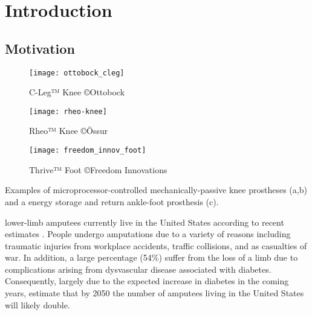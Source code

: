 \chapter{Introduction}\label{sec:intro}

\section{Motivation}\label{sec:intro_motivation}
\begin{marginfigure}[1in]
    \centering
	\begin{subfigure}[b]{\textwidth}
    	\centering
        \texttt{[image: ottobock\_cleg]}
        \caption{C-Leg™ Knee ©Ottobock}
        \label{fig:ottobock_cleg}
        \vspace{0.25in}
	\end{subfigure}
	\begin{subfigure}[b]{\textwidth}
    	\centering
        \texttt{[image: rheo-knee]}
        \caption{Rheo™  Knee ©Össur}
        \label{fig:ossur_rheo}
        \vspace{0.25in}
	\end{subfigure}
	\begin{subfigure}[b]{\textwidth}
    	\centering
        \texttt{[image: freedom\_innov\_foot]}
        \caption{Thrive™ Foot ©Freedom Innovations}
        \label{fig:freedom_innovations_foot}
	\end{subfigure}
    \caption{Examples of microprocessor-controlled mechanically-passive knee
    prostheses (a,b) and a energy storage and return ankle-foot prosthesis (c).}
\end{marginfigure}
 lower-limb amputees currently live in the
United States according to recent estimates \citep{ziegler2008estimating}.
People undergo amputations due to a variety of reasons including traumatic
injuries from workplace accidents, traffic collisions, and as casualties of war.
In addition, a large percentage (54\%) suffer from the loss of a limb due to
complications arising from dysvascular disease associated with diabetes.
Consequently, largely due to the expected increase in diabetes in the coming
years, \citet{ziegler2008estimating} estimate that by 2050 the number of
amputees living in the United States will likely double.

